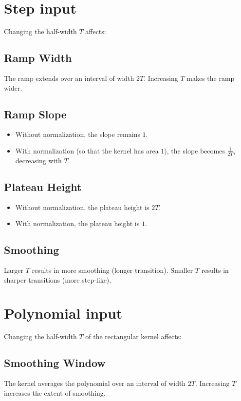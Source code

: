 \documentclass[12pt,a4paper]{report}
\begin{document}
\section{Step input}

Changing the half-width $T$ affects:
    \subsection{Ramp Width} The ramp extends over an interval of width $2T$. Increasing $T$ makes the ramp wider.
    \subsection{Ramp Slope}
    \begin{itemize}
        \item Without normalization, the slope remains $1$.
        \item With normalization (so that the kernel has area $1$), the slope becomes $\frac{1}{2T}$, decreasing with $T$.
    \end{itemize}
    \subsection{Plateau Height}
    \begin{itemize}
        \item Without normalization, the plateau height is $2T$.
        \item With normalization, the plateau height is $1$.
    \end{itemize}
    \subsection{Smoothing} Larger $T$ results in more smoothing (longer transition). Smaller $T$ results in sharper transitions (more step-like).
\section{Polynomial input}

Changing the half-width $T$ of the rectangular kernel affects:

\subsection{Smoothing Window} The kernel averages the polynomial over an interval of width $2T$. Increasing $T$ increases the extent of smoothing.
\end{document}
